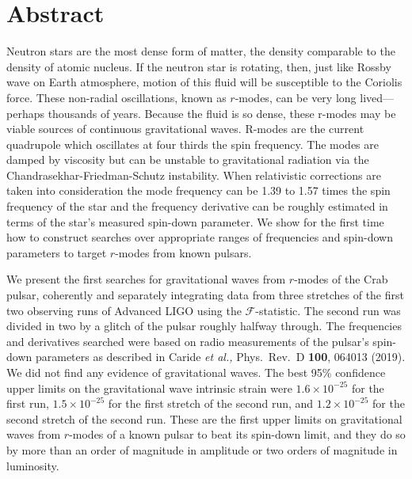 \documentclass{ttuthes2007}
\begin{document}
\chapter{\textbf{Abstract}}
Neutron stars are the most dense form of matter, the density comparable to the
density of atomic nucleus.  If the neutron star is rotating, then, just like
Rossby wave on Earth atmosphere, motion of this fluid will be susceptible to the
Coriolis force. These non-radial oscillations, known as $r$-modes, can be very
long lived---perhaps thousands of years. Because the fluid is so dense, these
r-modes may be viable sources of continuous gravitational waves.  R-modes are
the current quadrupole which oscillates at four thirds the spin frequency. The
modes are damped by viscosity but can be unstable to gravitational radiation via
the Chandrasekhar-Friedman-Schutz instability. When relativistic corrections are
taken into consideration the mode frequency can be 1.39 to 1.57 times the spin
frequency of the star and the frequency derivative can be roughly estimated in
terms of the star's measured spin-down parameter. We show for the first time how
to construct searches over appropriate ranges of frequencies and spin-down
parameters to target $r$-modes from known pulsars. 

We present the first searches for gravitational waves from $r$-modes of the Crab
pulsar, coherently and separately integrating data from three stretches of the  
first two observing runs of Advanced LIGO using the $\mathcal{F}$-statistic.    
The second run was divided in two by a glitch of the pulsar roughly halfway     
through.  The frequencies and derivatives searched were based on radio          
measurements of the pulsar's spin-down parameters as described in Caride        
\textit{et al.,} Phys.\ Rev.\ D \textbf{100}, 064013 (2019).  We did not find   
any evidence of gravitational waves. The best 95\% confidence upper limits on   
the gravitational wave intrinsic strain were $1.6\times10^{-25}$ for the first  
run, $1.5\times10^{-25}$ for the first stretch of the second run, and           
$1.2\times10^{-25}$ for the second stretch of the second run. These are the     
first upper limits on gravitational waves from $r$-modes of a known pulsar to   
beat its spin-down limit, and they do so by more than an order of magnitude in  
amplitude or two orders of magnitude in luminosity.                             
                                          
\end{document}
